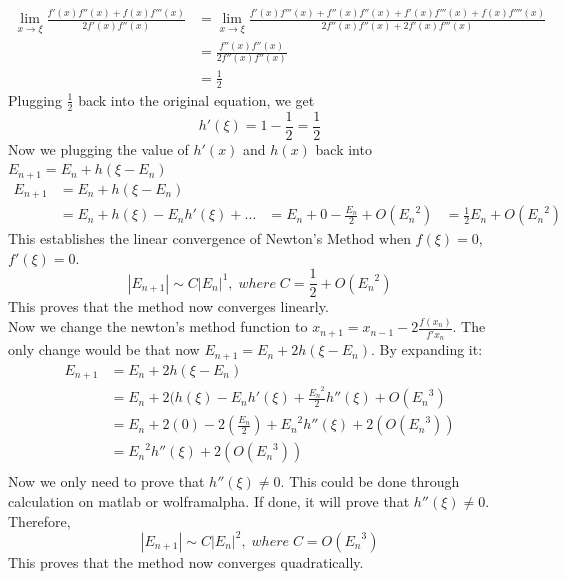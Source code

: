 \documentclass{article}
\begin{document}
\begin{equation*}
\begin{aligned}
\lim_{x\to\xi} \frac{f'(x)f''(x) + f(x)f'''(x)}{2f'(x)f''(x)} &= \lim_{x\to\xi} \frac{f'(x)f'''(x) + f''(x)f''(x) + f'(x)f'''(x) + f(x)f''''(x)}{2f''(x)f''(x)+2f'(x)f'''(x)}\\
&= \frac{f''(x)f''(x)}{2f''(x)f''(x)}\\
&= \frac{1}{2}
\end{aligned}
\end{equation*} 
Plugging $\frac{1}{2}$ back into the original equation, we get
\begin{equation*}
h'(\xi) = 1 - \frac{1}{2} = \frac{1}{2} 
\end{equation*}
Now we plugging the value of $h'(x)$ and $h(x)$ back into $E_{n+1} = E_n + h(\xi - E_n )$
\begin{equation*}
\begin{aligned}
E_{n+1} &= E_n + h(\xi - E_n )\\
&= E_n + h(\xi) - E_nh'(\xi) + ...
&= E_n + 0 - \frac{E_n}{2} + O({E_n}^2)
&= \frac{1}{2}E_n + O({E_n}^2)
\end{aligned}
\end{equation*}
This establishes the linear convergence of Newton's Method when $f(\xi) = 0$,$f'(\xi) = 0$.
\begin{equation*}
|E_{n+1}| \sim C|E_n|^1,\;where\;C=\frac{1}{2} + O({E_n}^2)
\end{equation*}
This proves that the method now converges linearly.\\
Now we change the newton's method function to $x_{n+1} = x_{n-1} - 2\frac{f(x_n)}{f'{x_n}}$. The only change would be that now $E_{n+1} = E_n + 2h(\xi - E_n)$. By expanding it:
\begin{equation*}
\begin{aligned}
E_{n+1} &= E_n + 2h(\xi - E_n )\\
&= E_n + 2(h(\xi) - E_nh'(\xi) + \frac{{E_n}^2}{2}h''(\xi) + O({E_n}^3) \\
&= E_n + 2(0) - 2(\frac{E_n}{2}) + {E_n}^2h''(\xi) + 2(O({E_n}^3)) \\
& = {E_n}^2h''(\xi) + 2(O({E_n}^3)) \\
\end{aligned}
\end{equation*}
Now we only need to prove that $h''(\xi) \neq 0$. This could be done through calculation on matlab or wolframalpha. If done, it will prove that $h''(\xi) \neq 0$.
Therefore,
\begin{equation*}
|E_{n+1}| \sim C|E_n|^2,\;where\;C= O({E_n}^3)
\end{equation*}
This proves that the method now converges quadratically.
\end{document}
